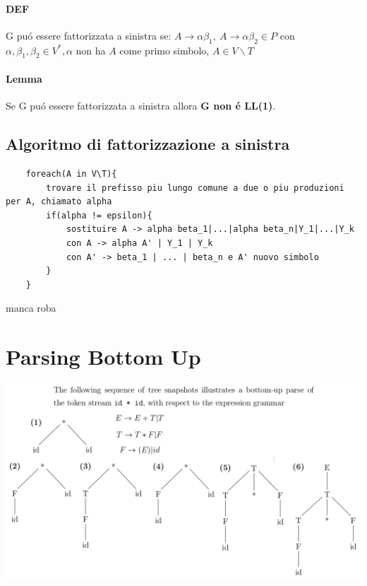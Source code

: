 \subsubsection{DEF}
G pu\'o essere fattorizzata a sinistra se:
$A \rightarrow \alpha \beta _1,\ A \rightarrow \alpha\beta _2 \in P$ con \\
$\alpha , \beta _1, \beta _2 \in V^*, \alpha $ non ha $A$ come primo simbolo, $A \in V\backslash T$

\subsubsection{Lemma}
Se G pu\'o essere fattorizzata a sinistra allora \textbf{G non \'e LL(1)}.

\section{Algoritmo di fattorizzazione a sinistra}
\begin{lstlisting}
    foreach(A in V\T){
        trovare il prefisso piu lungo comune a due o piu produzioni per A, chiamato alpha 
        if(alpha != epsilon){
            sostituire A -> alpha beta_1|...|alpha beta_n|Y_1|...|Y_k
            con A -> alpha A' | Y_1 | Y_k 
            con A' -> beta_1 | ... | beta_n e A' nuovo simbolo
        }
    }
\end{lstlisting}

manca roba

\chapter{Parsing Bottom Up}
\begin{center}
    \includegraphics[scale=0.4]{Chapters/Img/c04_02.png}\\
\end{center}


